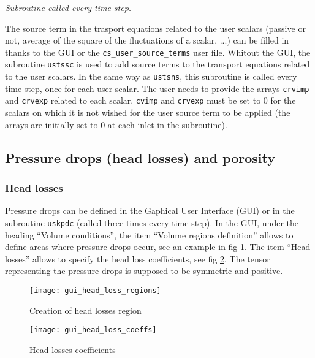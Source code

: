 {{{\noindent
\textit{Subroutine called every time step.}

The source term in the trasport equations related to the user scalars
(passive or not, average of the square of the fluctuations of a scalar, ...) 
can be filled in thanks to the GUI or the \texttt{cs\_user\_source\_terms} user file.
Whitout the GUI, the subroutine \texttt{ustssc} is used to add source terms to the 
transport equations related to the user scalars. In the same way as
\texttt{ustsns}, this subroutine is called every time step, once for
each user scalar. The user needs to provide the arrays \texttt{crvimp}
and \texttt{crvexp} related to each scalar. \texttt{cvimp} and \texttt{crvexp}
must be set to 0 for the scalars on which it is not wished for the user source
term to be applied (the arrays are initially set to 0 at each inlet in the subroutine).

\subsection{Pressure drops (head losses) and porosity}
\label{prg_headlosses}

\subsubsection{Head losses}

Pressure drops can be defined in the Gaphical User Interface (GUI) or in the subroutine \texttt{uskpdc} (called three times every time step). In the GUI, under the heading ``Volume conditions'', the item ``Volume regions definition'' allows to define areas where pressure drops occur, see an example in fig \ref{fig:hl1}. The item ``Head losses'' allows to specify the head loss coefficients, see fig \ref{fig:hl2}. The tensor representing the pressure drops is supposed to be symmetric
and positive.

\begin{figure}[!ht]
\begin{center}
\texttt{[image: gui\_head\_loss\_regions]}
\caption{Creation of head losses region}
\label{fig:hl1}
\end{center}
\end{figure}
%
\begin{figure}[!ht]
\begin{center}
\texttt{[image: gui\_head\_loss\_coeffs]}
\caption{Head losses coefficients}
\label{fig:hl2}
\end{center}
\end{figure}

}}}
